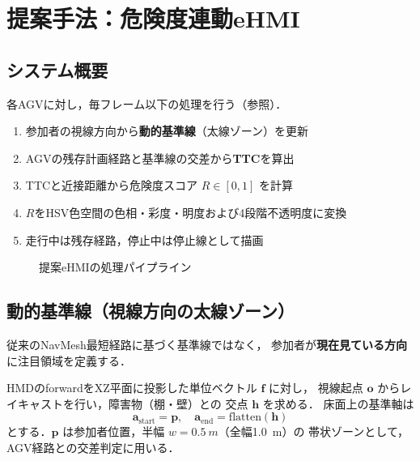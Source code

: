 \section{提案手法：危険度連動eHMI}
\label{sec:method}

\subsection{システム概要}

各AGVに対し，毎フレーム以下の処理を行う（参照）．

\begin{enumerate}[leftmargin=2em]
  \item 参加者の視線方向から\textbf{動的基準線}（太線ゾーン）を更新
  \item AGVの残存計画経路と基準線の交差から\textbf{TTC}を算出
  \item TTCと近接距離から危険度スコア $R \in [0,1]$ を計算
  \item $R$をHSV色空間の色相・彩度・明度および4段階不透明度に変換
  \item 走行中は残存経路，停止中は停止線として描画
\end{enumerate}

\begin{figure}[htbp]
  \centering
  \caption{提案eHMIの処理パイプライン}
  \label{fig:system}
\end{figure}

\subsection{動的基準線（視線方向の太線ゾーン）}

従来のNavMesh最短経路に基づく基準線ではなく，
参加者が\textbf{現在見ている方向}に注目領域を定義する．

HMDのforwardをXZ平面に投影した単位ベクトル $\mathbf{f}$ に対し，
視線起点 $\mathbf{o}$ からレイキャストを行い，障害物（棚・壁）との
交点 $\mathbf{h}$ を求める．
床面上の基準軸は
\begin{equation}
  \mathbf{a}_\text{start} = \mathbf{p}, \quad
  \mathbf{a}_\text{end} = \mathrm{flatten}(\mathbf{h})
\end{equation}
とする．$\mathbf{p}$ は参加者位置，半幅 $w=\SI{0.5}{m}$（全幅\SI{1.0}{m}）の
帯状ゾーンとして，AGV経路との交差判定に用いる．

